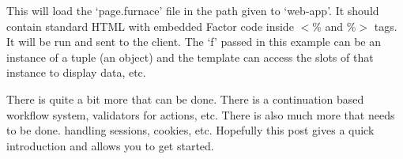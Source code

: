 This will load the `page.furnace' file in the path given to `web-app'. It should contain standard
HTML with embedded Factor code inside $<$\% and \%$>$ tags. It will be run and sent to the
client. The `f' passed in this example can be an instance of a tuple (an object) and the template
can access the slots of that instance to display data, etc.

There is quite a bit more that can be done. There is a continuation
based workflow system, validators for actions, etc. There is also much
more that needs to be done. handling sessions, cookies, etc. Hopefully
this post gives a quick introduction and allows you to get started.

